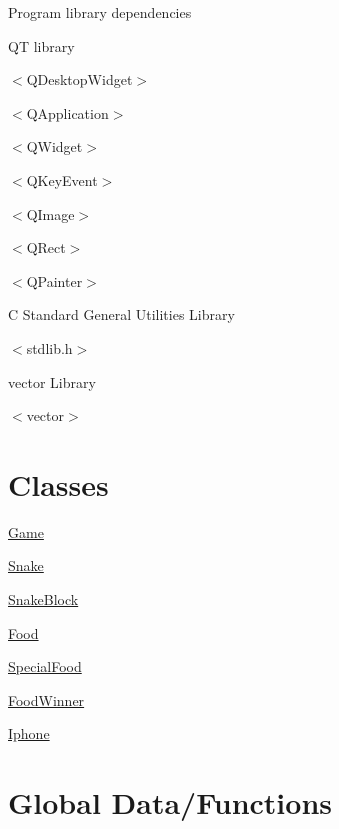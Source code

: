 \-Program library dependencies
\begin{DoxyItemize}
\item \-Q\-T library
\begin{DoxyItemize}
\item $<$\-Q\-Desktop\-Widget$>$
\item $<$\-Q\-Application$>$
\item $<$\-Q\-Widget$>$
\item $<$\-Q\-Key\-Event$>$
\item $<$\-Q\-Image$>$
\item $<$\-Q\-Rect$>$
\item $<$\-Q\-Painter$>$
\end{DoxyItemize}
\item \-C \-Standard \-General \-Utilities \-Library
\begin{DoxyItemize}
\item $<$stdlib.\-h$>$
\end{DoxyItemize}
\item vector \-Library
\begin{DoxyItemize}
\item $<$vector$>$
\end{DoxyItemize}
\end{DoxyItemize}



 \hypertarget{index_Classes}{}\section{\-Classes}\label{index_Classes}

\begin{DoxyItemize}
\item \hyperlink{classGame}{\-Game}
\item \hyperlink{classSnake}{\-Snake}
\item \hyperlink{classSnakeBlock}{\-Snake\-Block}
\item \hyperlink{classFood}{\-Food}
\begin{DoxyItemize}
\item \hyperlink{classSpecialFood}{\-Special\-Food}
\item \hyperlink{classFoodWinner}{\-Food\-Winner}
\end{DoxyItemize}
\item \hyperlink{classIphone}{\-Iphone}
\end{DoxyItemize}



 \hypertarget{index_Global_functions}{}\section{\-Global Data/\-Functions}\label{index_Global_functions}

